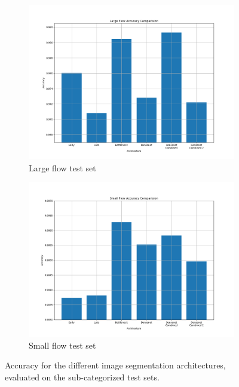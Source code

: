 \begin{figure}[H]
\begin{subfigure}{.48\textwidth}
		\centering
		\includegraphics[width=\linewidth]{results_flow/Large_Flow_Accuracy_Comparision.png}
		\caption[figure]{Large flow test set}
		\label{fig:resu_flow_LF_acc}
	\end{subfigure}
	\begin{subfigure}{.48\textwidth}
		\centering
		\includegraphics[width=\linewidth]{results_flow/Small_Flow_Accuracy_Comparision.png}
		\caption[figure]{Small flow test set}
		\label{fig:resu_flow_SF_acc}
	\end{subfigure} 	
	\caption[figure]{Accuracy for the different image segmentation architectures, evaluated on the sub-categorized test sets.}
	\label{fig:resu_flow_sets_acc}
\end{figure}

